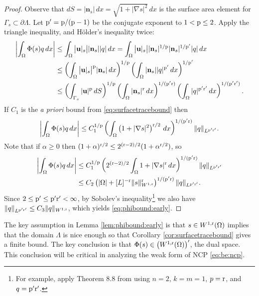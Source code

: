 \documentclass[hidelinks,onefignum,onetabnum,final]{siamart220329}  %
\newcommand{\grad}{\nabla}
\newcommand{\bn}{\mathbf{n}}
\newcommand{\bu}{\mathbf{u}}
\newcommand{\pp}{{\text{\textnormal{p}}}}
\newcommand{\rr}{{\text{\textnormal{r}}}}
\begin{document}
\begin{proof}  Observe that $dS = |\bn_s|\,dx = \sqrt{1+|\grad s|^2}\,dx$ is the surface area element for $\Gamma_s \subset \partial \Lambda$.  Let $\pp'=\pp/(\pp-1)$ be the conjugate exponent to $1<\pp\le 2$.  Apply the triangle inequality, and H\"older's inequality twice:
\begin{align}
\left|\int_\Omega \Phi(s) q\,dx\right| &\le \int_\Omega \big|\bu|_s\big| |\bn_s| |q|\,dx = \int_\Omega \big|\bu|_s\big| |\bn_s|^{1/\pp} |\bn_s|^{1/\pp'} |q|\,dx \label{eq:phibound:zero} \\
    &\le \left(\int_\Omega \big|\bu|_s\big|^\pp |\bn_s|\,dx\right)^{1/\pp} \left(\int_\Omega |\bn_s| |q|^{\pp'} \,dx\right)^{1/\pp'} \notag \\
    &\le \left(\int_{\Gamma_s} |\bu|^\pp \,dS\right)^{1/\pp} \left(\int_\Omega |\bn_s|^\rr \,dx\right)^{1/(\pp'\rr)} \left(\int_\Omega |q|^{\pp'\rr'} \,dx\right)^{1/(\pp'\rr')}. \notag
\end{align}
If $C_1$ is the \emph{a priori} bound from \eqref{eq:surfacetracebound} then
\begin{equation}
\left|\int_\Omega \Phi(s) q\,dx\right| \le C_1^{1/\pp} \left(\int_\Omega \left(1+|\grad s|^2\right)^{\rr/2}\,dx\right)^{1/(\pp'\rr)} \|q\|_{L^{\pp'\rr'}}.
\end{equation}
Note that if $\alpha\ge 0$ then $(1+\alpha)^{\rr/2} \le 2^{(\rr-2)/2} (1+\alpha^{\rr/2})$, so
\begin{align}
\left|\int_\Omega \Phi(s) q\,dx\right| &\le C_1^{1/\pp} \left(2^{(\rr-2)/2} \int_\Omega 1 + |\grad s|^\rr\,dx\right)^{1/(\pp'\rr)} \|q\|_{L^{\pp'\rr'}} \label{eq:phibound:one} \\
  &\le C_2 \left(|\Omega| + [L]^{-\rr}\|s\|_{W^{1,\rr}}^\rr\right)^{1/(\pp'\rr)} \|q\|_{L^{\pp'\rr'}}. \notag
\end{align}
Since $2 \le \pp' \le \pp'\rr' < \infty$, by Sobolev's inequality\footnote{For example, apply Theorem 8.8 from \cite{LiebLoss1997} using $n=2$, $k=m=1$, $p=\rr$, and $q=\pp'\rr'$.} we also have $\|q\|_{L^{\pp'\rr'}} \le C_3 \|q\|_{W^{1,\rr}}$, which yields \eqref{eq:phibound:early}.
\end{proof}

The key assumption in Lemma \ref{lem:phibound:early} is that $s\in W^{1,\rr}(\Omega)$ implies that the domain $\Lambda$ is nice enough so that Corollary \ref{cor:surfacetracebound} gives a finite bound.  The key conclusion is that $\Phi(s) \in \left(W^{1,\rr}(\Omega)\right)'$, the dual space.  This conclusion will be critical in analyzing the weak form of NCP \eqref{eq:be:ncp}.
\end{document}
